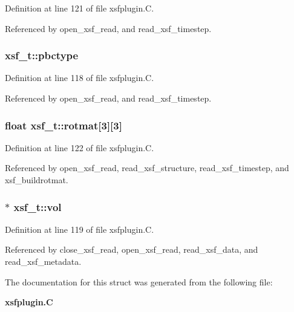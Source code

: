 Definition at line 121 of file xsfplugin.C.

Referenced by open\_\-xsf\_\-read, and read\_\-xsf\_\-timestep.
\subsubsection{ xsf\_\-t::pbctype}\label{structxsf__t_m7}




Definition at line 118 of file xsfplugin.C.

Referenced by open\_\-xsf\_\-read, and read\_\-xsf\_\-timestep.
\subsubsection{\setlength{\rightskip}{0pt plus 5cm}float xsf\_\-t::rotmat[3][3]}\label{structxsf__t_m11}




Definition at line 122 of file xsfplugin.C.

Referenced by open\_\-xsf\_\-read, read\_\-xsf\_\-structure, read\_\-xsf\_\-timestep, and xsf\_\-buildrotmat.
\subsubsection{$\ast$ xsf\_\-t::vol}\label{structxsf__t_m8}




Definition at line 119 of file xsfplugin.C.

Referenced by close\_\-xsf\_\-read, open\_\-xsf\_\-read, read\_\-xsf\_\-data, and read\_\-xsf\_\-metadata.

The documentation for this struct was generated from the following file:\begin{CompactItemize}
\item 
{\bf xsfplugin.C}\end{CompactItemize}
